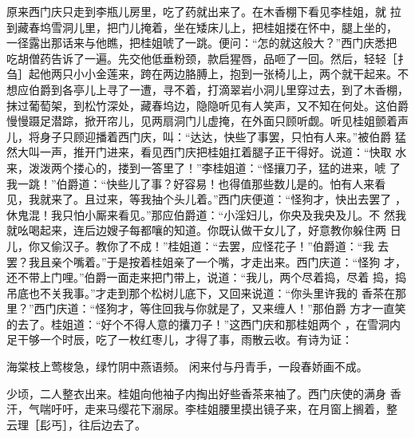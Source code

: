 原来西门庆只走到李瓶儿房里，吃了药就出来了。在木香棚下看见李桂姐，就
拉到藏春坞雪洞儿里，把门儿掩着，坐在矮床儿上，把桂姐搂在怀中，腿上坐的，
一径露出那话来与他瞧，把桂姐唬了一跳。便问：“怎的就这般大？”西门庆悉把
吃胡僧药告诉了一遍。先交他低垂粉颈，款启猩唇，品咂了一回。然后，轻轻［扌
刍］起他两只小小金莲来，跨在两边胳膊上，抱到一张椅儿上，两个就干起来。不
想应伯爵到各亭儿上寻了一遭，寻不着，打滴翠岩小洞儿里穿过去，到了木香棚，
抹过葡萄架，到松竹深处，藏春坞边，隐隐听见有人笑声，又不知在何处。这伯爵
慢慢蹑足潜踪，掀开帘儿，见两扇洞门儿虚掩，在外面只顾听觑。听见桂姐颤着声
儿，将身子只顾迎播着西门庆，叫：“达达，快些了事罢，只怕有人来。”被伯爵
猛然大叫一声，推开门进来，看见西门庆把桂姐扛着腿子正干得好。说道：“快取
水来，泼泼两个搂心的，搂到一答里了！”李桂姐道：“怪攘刀子，猛的进来，唬
了我一跳！”伯爵道：“快些儿了事？好容易！也得值那些数儿是的。怕有人来看
见，我就来了。且过来，等我抽个头儿着。”西门庆便道：“怪狗才，快出去罢了
，休鬼混！我只怕小厮来看见。”那应伯爵道：“小淫妇儿，你央及我央及儿。不
然我就吆喝起来，连后边嫂子每都嚷的知道。你既认做干女儿了，好意教你躲住两
日儿，你又偷汉子。教你了不成！”桂姐道：“去罢，应怪花子！”伯爵道：“我
去罢？我且亲个嘴着。”于是按着桂姐亲了一个嘴，才走出来。西门庆道：“怪狗
才，还不带上门哩。”伯爵一面走来把门带上，说道：“我儿，两个尽着捣，尽着
捣，捣吊底也不关我事。”才走到那个松树儿底下，又回来说道：“你头里许我的
香茶在那里？”西门庆道：“怪狗才，等住回我与你就是了，又来缠人！”那伯爵
方才一直笑的去了。桂姐道：“好个不得人意的攮刀子！”这西门庆和那桂姐两个
，在雪洞内足干够一个时辰，吃了一枚红枣儿，才得了事，雨散云收。有诗为证：

海棠枝上莺梭急，绿竹阴中燕语频。
闲来付与丹青手，一段春娇画不成。

少顷，二人整衣出来。桂姐向他袖子内掏出好些香茶来袖了。西门庆使的满身
香汗，气喘吁吁，走来马缨花下溺尿。李桂姐腰里摸出镜子来，在月窗上搁着，整
云理［髟丐］，往后边去了。

